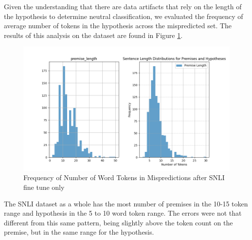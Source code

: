 \documentclass[11pt]{article}
\begin{document}
Given the understanding that there are data artifacts that rely on the length of the hypothesis to determine neutral classification, we evaluated the frequency of average number of tokens in the hypothesis across the mispredicted set. The results of this analysis on the dataset are found in Figure \ref{fig:EarlyTokenCount}.
\begin{figure}[h!]
    \centering
    \includegraphics[width=0.85\linewidth]{FigurePremiseHypoWordCountFrequency.png}
    \caption{Frequency of Number of Word Tokens in Mispredictions after SNLI fine tune only}
    \label{fig:EarlyTokenCount}
\end{figure}
The SNLI dataset as a whole has the most number of premises in the 10-15 token range and hypothesis in the 5 to 10 word token range. The errors were not that different from this same pattern, being slightly above the token count on the premise, but in the same range for the hypothesis.
\end{document}

